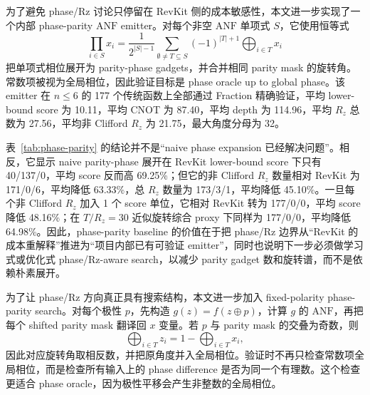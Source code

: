 \documentclass[UTF8,fontset=macnew,11pt]{ctexart}
\newcommand{\anf}{\ensuremath{\mathrm{ANF}}}
\newcommand{\xor}{\ensuremath{\oplus}}
\newcommand{\rz}{\ensuremath{R_z}}
\begin{document}
为了避免 phase/Rz 讨论只停留在 RevKit 侧的成本敏感性，本文进一步实现了一个内部 phase-parity \anf{} emitter。对每个非空 \anf{} 单项式 $S$，它使用恒等式
\begin{equation}
  \prod_{i\in S}x_i =
  \frac{1}{2^{|S|-1}}\sum_{\emptyset\neq T\subseteq S}(-1)^{|T|+1}
  \bigoplus_{i\in T}x_i
  \label{eq:phase-parity}
\end{equation}
把单项式相位展开为 parity-phase gadgets，并合并相同 parity mask 的旋转角。常数项被视为全局相位，因此验证目标是 phase oracle up to global phase。该 emitter 在 $n\leq6$ 的 177 个传统函数上全部通过 Fraction 精确验证，平均 lower-bound score 为 10.11，平均 CNOT 为 87.40，平均 depth 为 114.96，平均 \rz{} 总数为 27.56，平均非 Clifford \rz{} 为 21.75，最大角度分母为 32。

\begin{table}[H]
\centering
\small
\caption{Phase-parity \anf{} emitter 与 RevKit \texttt{oracle\_synth} 的 phase/Rz 同口径比较。该 emitter 实现 phase oracle up to global phase；lower-bound score 只计 T-like rotations，非 Clifford \rz{} 单独报告。}
\label{tab:phase-parity}

\end{table}

表~\ref{tab:phase-parity} 的结论并不是“naive phase expansion 已经解决问题”。相反，它显示 naive parity-phase 展开在 RevKit lower-bound score 下只有 40/137/0，平均 score 反而高 69.25\%；但它的非 Clifford \rz{} 数量相对 RevKit 为 171/0/6，平均降低 63.33\%，总 \rz{} 数量为 173/3/1，平均降低 45.10\%。一旦每个非 Clifford \rz{} 加入 1 个 score 单位，它相对 RevKit 转为 177/0/0，平均 score 降低 48.16\%；在 $T/R_z=30$ 近似旋转综合 proxy 下同样为 177/0/0，平均降低 64.98\%。因此，phase-parity baseline 的价值在于把 phase/Rz 边界从“RevKit 的成本重解释”推进为“项目内部已有可验证 emitter”，同时也说明下一步必须做学习式或优化式 phase/Rz-aware search，以减少 parity gadget 数和旋转谱，而不是依赖朴素展开。

为了让 phase/Rz 方向真正具有搜索结构，本文进一步加入 fixed-polarity phase-parity search。对每个极性 $p$，先构造 $g(z)=f(z\xor p)$，计算 $g$ 的 \anf{}，再把每个 shifted parity mask 翻译回 $x$ 变量。若 $p$ 与 parity mask 的交叠为奇数，则
\begin{equation}
  \bigoplus_{i\in T} z_i
  =
  1 -
  \bigoplus_{i\in T} x_i ,
\end{equation}
因此对应旋转角取相反数，并把原角度并入全局相位。验证时不再只检查常数项全局相位，而是检查所有输入上的 phase difference 是否为同一个有理数。这个检查更适合 phase oracle，因为极性平移会产生非整数的全局相位。
\end{document}
